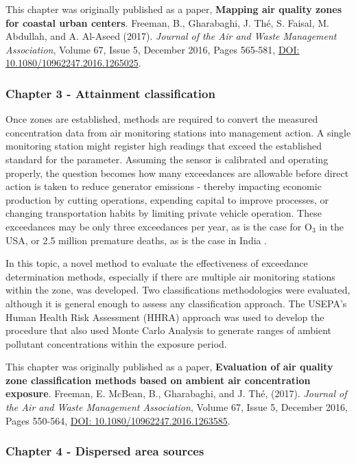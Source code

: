 This chapter was originally published as a paper, \textbf{Mapping air quality zones for coastal urban centers}. Freeman, B., Gharabaghi, J.  Th\'e, S. Faisal, M. Abdullah, and A. Al-Aseed (2017). \textit{Journal of the Air and Waste Management Association}, Volume 67, Issue 5, December 2016, Pages 565-581, \url{ DOI: 10.1080/10962247.2016.1265025}.

\subsubsection*{Chapter 3 - Attainment classification}

Once zones are established, methods are required to convert the measured concentration data from air monitoring stations into management action. A single monitoring station might register high readings that exceed the established standard for the parameter. Assuming the sensor is calibrated and operating properly, the question becomes how many exceedances are allowable before direct action is taken to reduce generator emissions - thereby impacting economic production by cutting operations, expending capital to improve processes, or changing transportation habits by limiting private vehicle operation. These exceedances may be only three exceedances per year, as is the case for O$_{3}$ in the USA, or 2.5 million premature deaths, as is the case in India \citep{Landrigan2017}.

In this topic,  a novel method to evaluate the effectiveness of exceedance determination methods, especially if there are multiple air monitoring stations within the zone, was developed. Two classifications methodologies were evaluated, although it is general enough to assess any classification approach. The USEPA's Human Health Risk Assessment (HHRA) approach was used to develop the procedure that also used Monte Carlo Analysis to generate ranges of ambient pollutant concentrations within the exposure period.

This chapter was originally published as a paper, \textbf{Evaluation of air quality zone classification methods based on ambient air concentration exposure}. Freeman, E. McBean, B., Gharabaghi, and J.  Th\'e, (2017). \textit{Journal of the Air and Waste Management Association}, Volume 67, Issue 5, December 2016, Pages 550-564, \url{DOI: 10.1080/10962247.2016.1263585}.

\subsubsection*{Chapter 4 - Dispersed area sources}

